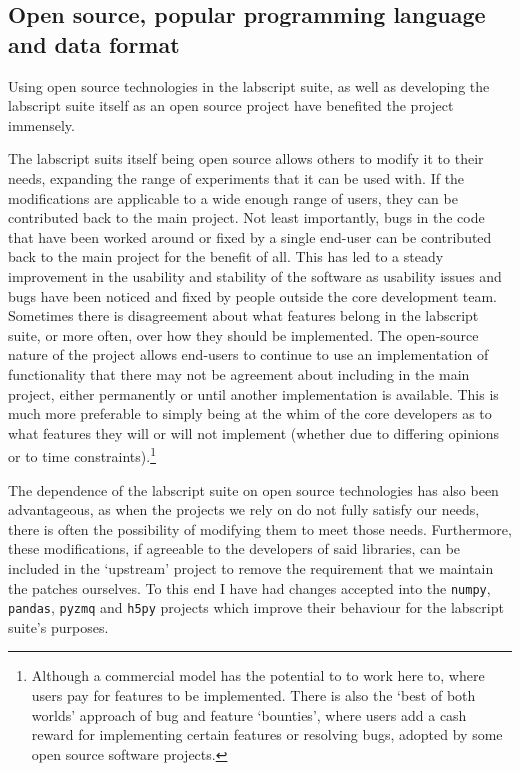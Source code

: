 \subsection{Open source, popular programming language and data format}

Using open source technologies in the labscript suite, as well as developing the labscript suite itself as an open source project have benefited the project immensely.

The labscript suits itself being open source allows others to modify it to their needs, expanding the range of experiments that it can be used with. If the modifications are applicable to a wide enough range of users, they can be contributed back to the main project. Not least importantly, bugs in the code that have been worked around or fixed by a single end-user can be contributed back to the main project for the benefit of all. This has led to a steady improvement in the usability and stability of the software as usability issues and bugs have been noticed and fixed by people outside the core development team. Sometimes there is disagreement about what features belong in the labscript suite, or more often, over how they should be implemented. The open-source nature of the project allows end-users to continue to use an implementation of functionality that there may not be agreement about including in the main project, either permanently or until another implementation is available. This is much more preferable to simply being at the whim of the core developers as to what features they will or will not implement (whether due to differing opinions or to time constraints).\footnote{Although a commercial model has the potential to to work here to, where users pay for features to be implemented. There is also the `best of both worlds' approach of bug and feature `bounties', where users add a cash reward for implementing certain features or resolving bugs, adopted by some open source software projects.}

The dependence of the labscript suite on open source technologies has also been advantageous, as when the projects we rely on do not fully satisfy our needs, there is often the possibility of modifying them to meet those needs. Furthermore, these modifications, if agreeable to the developers of said libraries, can be included in the `upstream' project to remove the requirement that we maintain the patches ourselves. To this end I have had changes accepted into the \texttt{numpy}, \texttt{pandas}, \texttt{pyzmq} and \texttt{h5py} projects which improve their behaviour for the labscript suite's purposes. 

